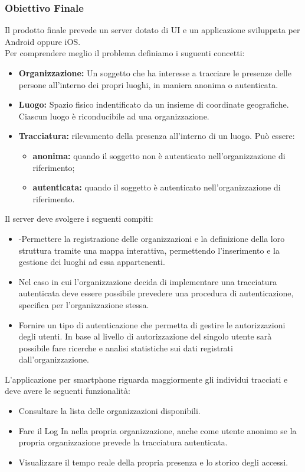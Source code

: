 	\subsubsection{Obiettivo Finale}
	Il prodotto finale prevede un server dotato di UI e un applicazione sviluppata per Android oppure iOS.\\
	Per comprendere meglio il problema definiamo i suguenti concetti:
	\begin{itemize}
		\item \textbf{Organizzazione:} Un soggetto che ha interesse a tracciare le presenze delle persone all’interno dei propri luoghi, in maniera anonima o autenticata.
		\item \textbf{Luogo:} Spazio fisico indentificato da un insieme di coordinate geografiche. Ciascun luogo è riconducibile ad una organizzazione. 
		\item \textbf{Tracciatura:}  rilevamento della presenza all’interno di un luogo. Può essere:
		\begin{itemize}
			\item \textbf{anonima:} quando il soggetto non è autenticato nell’organizzazione di riferimento;
			\item \textbf{autenticata:} quando il soggetto è autenticato nell’organizzazione di riferimento.
		\end{itemize}
	\end{itemize}
	Il server deve svolgere i seguenti compiti:
	\begin{itemize}
		\item -Permettere la registrazione delle organizzazioni e la definizione della loro struttura tramite una mappa interattiva, permettendo l'inserimento e la gestione dei luoghi ad essa appartenenti.
		\item Nel caso in cui l'organizzazione decida di implementare una tracciatura autenticata deve essere possibile prevedere una procedura di autenticazione, specifica per l'organizzazione stessa.
		\item Fornire un tipo di autenticazione che permetta di gestire le autorizzazioni degli utenti. In base al livello di autorizzazione del singolo utente sarà possibile fare ricerche e analisi statistiche sui dati registrati dall'organizzazione.
	\end{itemize}
	L'applicazione per smartphone riguarda maggiormente gli individui tracciati e deve avere le seguenti funzionalità:
	\begin{itemize}
		\item Consultare la lista delle organizzazioni disponibili.
		\item Fare il Log In nella propria organizzazione, anche come utente anonimo se la propria organizzazione prevede la tracciatura autenticata.
		\item Visualizzare il tempo reale della propria presenza e lo storico degli accessi.
	\end{itemize}
